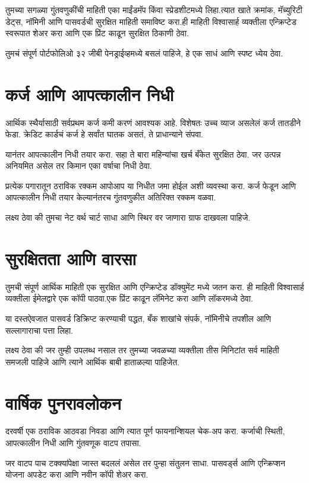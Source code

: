 तुमच्या सगळ्या गुंतवणुकींची माहिती एका माईंडमॅप किंवा स्प्रेडशीटमध्ये लिहा.त्यात खाते क्रमांक, मॅच्युरिटी डेट्स, नॉमिनी आणि पासवर्डची सुरक्षित माहिती समाविष्ट करा.ही माहिती विश्वासार्ह व्यक्तीला एन्क्रिप्टेड स्वरूपात शेअर करा आणि एक प्रिंट काढून सुरक्षित ठिकाणी ठेवा.

तुमचं संपूर्ण पोर्टफोलिओ ३२ जीबी पेनड्राईव्हमध्ये बसलं पाहिजे, हे एक साधं आणि स्पष्ट ध्येय ठेवा.


\section*{कर्ज आणि आपत्कालीन निधी}

आर्थिक स्थैर्यासाठी सर्वप्रथम कर्ज कमी करणं आवश्यक आहे. विशेषतः उच्च व्याज असलेलं कर्ज तातडीने फेडा.
क्रेडिट कार्डचं कर्ज हे सर्वांत घातक असतं, ते प्राधान्याने संपवा.

यानंतर आपत्कालीन निधी तयार करा. सहा ते बारा महिन्यांचा खर्च बँकेत सुरक्षित ठेवा. जर उत्पन्न अनियमित असेल तर किमान एका वर्षाचा निधी ठेवा.

प्रत्येक पगारातून ठराविक रक्कम आपोआप या निधीत जमा होईल अशी व्यवस्था करा.
कर्ज फेडून आणि आपत्कालीन निधी तयार केल्यानंतरच गुंतवणुकीत अतिरिक्त रक्कम वळवा.

लक्ष्य ठेवा की तुमचा नेट वर्थ चार्ट साधा आणि स्थिर वर जाणारा ग्राफ दाखवला पाहिजे.

\section*{सुरक्षितता आणि वारसा}

तुमची संपूर्ण आर्थिक माहिती एक सुरक्षित आणि एन्क्रिप्टेड डॉक्युमेंट मध्ये जतन करा. ही माहिती विश्वासार्ह व्यक्तीला ईमेलद्वारे एक कॉपी पाठवा.एक प्रिंट काढून लॅमिनेट करा आणि लॉकरमध्ये ठेवा.

या दस्तऐवजात पासवर्ड डिक्रिप्ट करण्याची पद्धत, बँक शाखांचे संपर्क, नॉमिनीचे तपशील आणि सल्लागाराचा पत्ता लिहा.

लक्ष्य ठेवा की जर तुम्ही उपलब्ध नसाल तर तुमच्या जवळच्या व्यक्तीला तीस मिनिटांत सर्व माहिती समजली पाहिजे आणि त्याने आर्थिक बाबी हाताळल्या पाहिजेत.

\section*{वार्षिक पुनरावलोकन}

दरवर्षी एक ठराविक आठवडा निवडा आणि त्यात पूर्ण फायनान्शियल चेक-अप करा. कर्जाची स्थिती, आपत्कालीन निधी आणि गुंतवणूक वाटप तपासा.

जर वाटप पाच टक्क्यांपेक्षा जास्त बदललं असेल तर पुन्हा संतुलन साधा. पासवर्ड्स आणि एन्क्रिप्शन योजना अपडेट करा आणि नवीन कॉपी शेअर करा.

